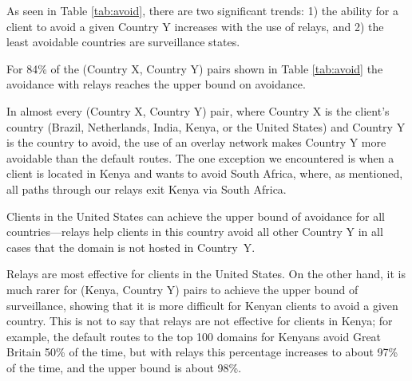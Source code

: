 
As seen in Table \ref{tab:avoid}, there are two significant trends: 1) the ability for a client to avoid a given Country Y increases with the use of relays, and 2) the least avoidable countries are surveillance states.

\begin{finding}
For 84\% of the (Country X, Country Y) pairs shown in Table \ref{tab:avoid} the avoidance with relays reaches the upper bound on avoidance. 
\end{finding}
\noindent
In almost every (Country X, Country Y) pair, where Country X is the
client's country (Brazil, Netherlands, India, Kenya, or the United
States) and Country Y is the country to avoid, the use of an overlay
network makes Country Y more avoidable than the default routes.  The one
exception we encountered is when a client is located in Kenya and wants
to avoid South Africa, where, as mentioned, all paths through our
relays exit Kenya via South Africa.

\begin{finding}
Clients in the United States can achieve the upper bound of avoidance for all countries---relays help clients in this country avoid all other Country Y in all cases that the domain is not hosted in Country~Y.  
\end{finding}
\noindent
Relays are most effective for clients in the United States.  On the other hand, it is much rarer for (Kenya, Country Y) pairs to achieve the upper bound of surveillance, showing that it is more difficult for Kenyan clients to avoid a given country.  This is not to say that relays are not effective for clients in Kenya; for example, the default routes to the top 100 domains for Kenyans avoid Great Britain 50\% of the time, but with relays this percentage increases to about 97\% of the time, and the upper bound is about 98\%. 

